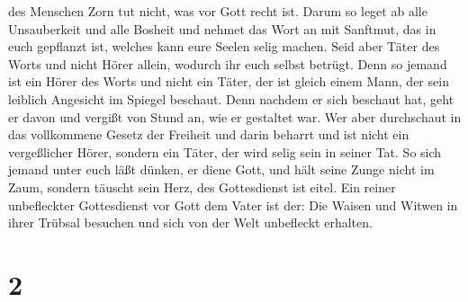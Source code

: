 des Menschen Zorn tut nicht, was vor Gott recht ist.  Darum
so leget ab alle Unsauberkeit und alle Bosheit und nehmet das Wort an
mit Sanftmut, das in euch gepflanzt ist, welches kann eure Seelen selig
machen.  Seid aber Täter des Worts und nicht Hörer allein,
wodurch ihr euch selbst betrügt.  Denn so jemand ist ein
Hörer des Worts und nicht ein Täter, der ist gleich einem Mann, der sein
leiblich Angesicht im Spiegel beschaut.  Denn nachdem er
sich beschaut hat, geht er davon und vergißt von Stund an, wie er
gestaltet war.  Wer aber durchschaut in das vollkommene
Gesetz der Freiheit und darin beharrt und ist nicht ein vergeßlicher
Hörer, sondern ein Täter, der wird selig sein in seiner Tat.
 So sich jemand unter euch läßt dünken, er diene Gott, und
hält seine Zunge nicht im Zaum, sondern täuscht sein Herz, des
Gottesdienst ist eitel.  Ein reiner unbefleckter
Gottesdienst vor Gott dem Vater ist der: Die Waisen und Witwen in ihrer
Trübsal besuchen und sich von der Welt unbefleckt erhalten.

\hypertarget{section-1}{%
\section{2}\label{section-1}}

